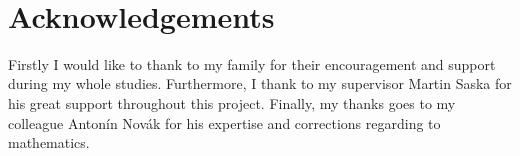 ~\vfill{}

\section*{Acknowledgements}

Firstly I would like to thank to my family for their encouragement and support during my whole studies. Furthermore, I thank to my supervisor Martin Saska for his great support throughout this project. Finally, my thanks goes to my colleague Antonín Novák for his expertise and corrections regarding to mathematics.

\vspace{2.5cm}

\newpage{}
